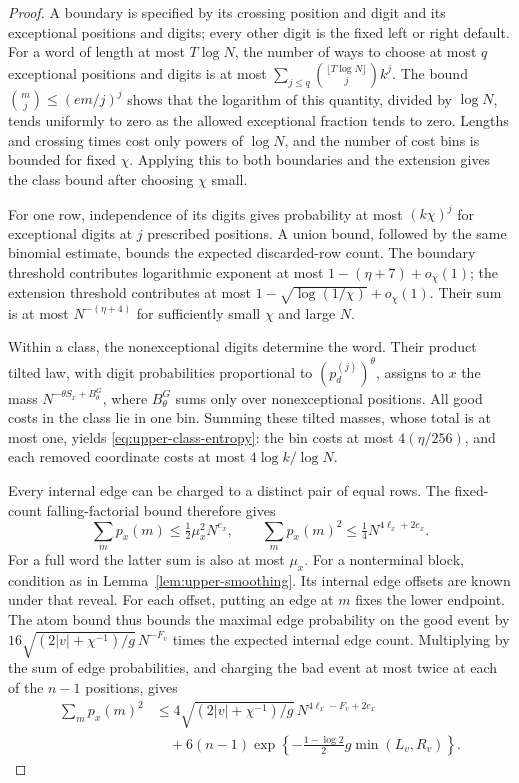\begin{proof}
A boundary is specified by its crossing position and digit and its
exceptional positions and digits; every other digit is the fixed
left or right default. For a word of length at most $T\log N$,
the number of ways to choose at most $q$ exceptional positions and
digits is at most $\sum_{j\le q}\binom{\lfloor T\log N\rfloor}j k^j$.
The bound $\binom mj\le(em/j)^j$ shows that the logarithm of this
quantity, divided by $\log N$, tends uniformly to zero as the
allowed exceptional fraction tends to zero. Lengths and crossing
times cost only powers of $\log N$, and the number of cost bins
is bounded for fixed $\chi$. Applying this to both boundaries and
the extension gives the class bound after choosing $\chi$ small.

For one row, independence of its digits gives probability at most
$(k\chi)^j$ for exceptional digits at $j$ prescribed positions.
A union bound, followed by the same binomial estimate, bounds the
expected discarded-row count. The boundary threshold contributes
logarithmic exponent at most $1-(\eta+7)+o_\chi(1)$; the extension
threshold contributes at most
$1-\sqrt{\log(1/\chi)}+o_\chi(1)$. Their sum is at most
$N^{-(\eta+4)}$ for sufficiently small $\chi$ and large $N$.

Within a class, the nonexceptional digits determine the word.
Their product tilted law, with digit probabilities proportional to
$(p_d^{(j)})^\theta$, assigns to $x$ the mass
$N^{-\theta S_x+B^G_\theta}$, where $B^G_\theta$ sums only over
nonexceptional positions. All good costs in the class lie in one
bin. Summing these tilted masses, whose total is at most one, yields
\eqref{eq:upper-class-entropy}: the bin costs at most $4(\eta/256)$,
and each removed coordinate costs at most $4\log k/\log N$.

Every internal edge can be charged to a distinct pair of equal rows.
The fixed-count falling-factorial bound therefore gives
\[
 \sum_m p_x(m)\le\tfrac12\mu_x^2N^{e_x},\qquad
 \sum_m p_x(m)^2\le\tfrac14 N^{4\ell_x+2e_x}.
\]
For a full word the latter sum is also at most $\mu_x$.
For a nonterminal block, condition as in
Lemma~\ref{lem:upper-smoothing}. Its internal edge offsets are known
under that reveal. For each offset, putting an edge at $m$ fixes
the lower endpoint. The atom bound thus bounds the maximal edge
probability on the good event by
$16\sqrt{(2|v|+\chi^{-1})/g}\,N^{-F_v}$ times the expected internal
edge count. Multiplying by the sum of edge probabilities, and
charging the bad event at most twice at each of the $n-1$ positions,
gives
\begin{align*}
 \sum_m p_x(m)^2
 &\le4\sqrt{(2|v|+\chi^{-1})/g}\,N^{4\ell_x-F_v+2e_x}\\
 &\quad+6(n-1)\exp\left\{-\frac{1-\log2}{2}g\min(L_v,R_v)\right\}.
\end{align*}


\end{proof}
